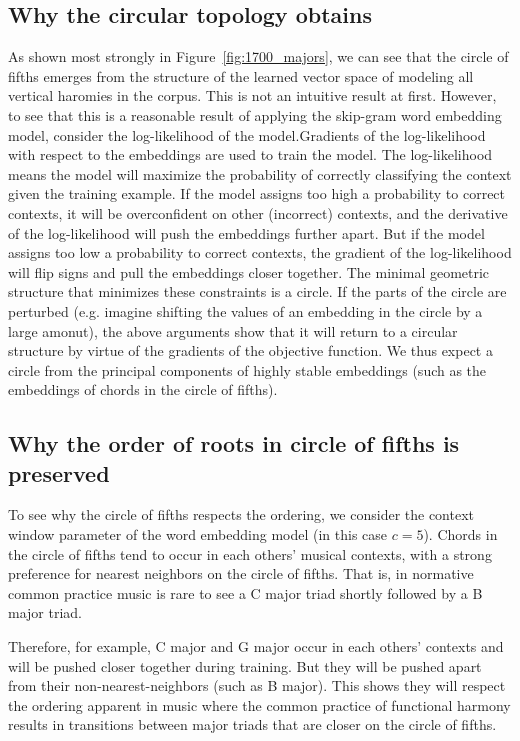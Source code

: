 
\subsection{Why the circular topology obtains}
As shown most strongly in Figure~\ref{fig:1700_majors}, we can see that the circle of fifths emerges from the structure of the learned vector space of modeling all vertical haromies in the corpus. This is not an intuitive result at first.
However, to see that this is a reasonable result of applying the skip-gram word embedding model, consider the log-likelihood of the model.Gradients of the log-likelihood with respect to the embeddings are used to train the model.
The log-likelihood means the model will maximize the probability of correctly classifying the context given the training example.
If the model assigns too high a probability to correct contexts, it will be overconfident on other (incorrect) contexts, and the derivative of the log-likelihood will push the embeddings further apart.
But if the model assigns too low a probability to correct contexts, the gradient of the log-likelihood will flip signs and pull the embeddings closer together.
The minimal geometric structure that minimizes these constraints is a circle. If the parts of the circle are perturbed (e.g. imagine shifting the values of an embedding in the circle by a large amonut), the above arguments show that it will return to a circular structure by virtue of the gradients of the objective function.
We thus expect a circle from the principal components of highly stable embeddings (such as the embeddings of chords in the circle of fifths).
\subsection{Why the order of roots in circle of fifths is preserved}
To see why the circle of fifths respects the ordering, we consider the context window parameter of the word embedding model (in this case $c = 5$). Chords in the circle of fifths tend to occur in each others' musical contexts, with a strong preference for nearest neighbors on the circle of fifths. That is, in normative common practice music is rare to see a C major triad shortly followed by a B major triad.

Therefore, for example, C major and G major occur in each others' contexts and will be pushed closer together during training. But they will be pushed apart from their non-nearest-neighbors (such as B major). This shows they will respect the ordering apparent in music where the common practice of functional harmony results in transitions between major triads that are closer on the circle of fifths.

